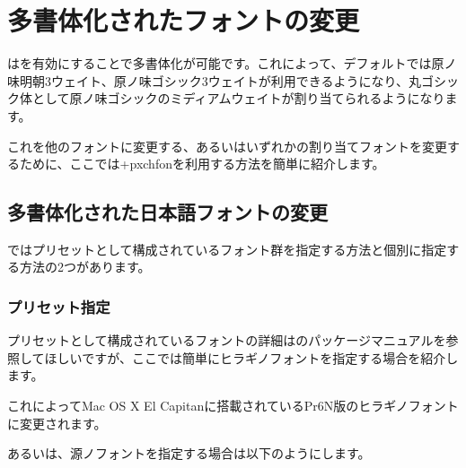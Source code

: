 \documentclass[../otf-unofficial-guide]{subfiles}
\begin{document}
\section{多書体化されたフォントの変更}

はを有効にすることで多書体化が可能です。これによって、デフォルトでは原ノ味明朝3ウェイト、原ノ味ゴシック3ウェイトが利用できるようになり、丸ゴシック体として原ノ味ゴシックのミディアムウェイトが割り当てられるようになります。

これを他のフォントに変更する、あるいはいずれかの割り当てフォントを変更するために、ここでは\pkg+{pxchfon}を利用する方法を簡単に紹介します。

\subsection{多書体化された日本語フォントの変更}

ではプリセットとして構成されているフォント群を指定する方法と個別に指定する方法の2つがあります。

\subsubsection{プリセット指定}

プリセットとして構成されているフォントの詳細はのパッケージマニュアルを参照してほしいですが、ここでは簡単にヒラギノフォントを指定する場合を紹介します。

\begin{texsource}
\usepackage[noalphabet, hiragino-elcapitan-pron]{pxchfon}
\end{texsource}

これによってMac OS X El Capitanに搭載されているPr6N版のヒラギノフォントに変更されます。

あるいは、源ノフォントを指定する場合は以下のようにします。

\begin{texsource}
\usepackage[noalphabet, sourcehan, unicode]{pxchfon}
\end{texsource}
\end{document}
